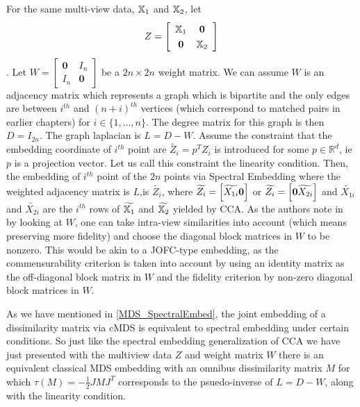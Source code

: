\documentclass[12pt,oneside,final]{thesis}\usepackage[]{graphicx}\usepackage[]{color}
\begin{document}
For the same multi-view data, $\mathbb{X}_1$ and $\mathbb{X}_2$,
let \[ Z= \left[
\begin{array}{cc}
                  \X_1 & \bm{0} \\
                \bm{0}   & \X_2 
                \end{array}
                \right]
                \].
                Let $W=\left[
                \begin{array}{cc}
                \bm{0} & I_n \\
                I_n   & \bm{0}
                \end{array}
                \right]$ be a $2n \times 2n$ weight matrix. We can assume $W$ is an adjacency matrix which represents a graph which is bipartite and the only  edges are between $i^{th}$ and $(n+i)^{th}$ vertices (which correspond to matched pairs in earlier chapters) for $i \in \{1,\ldots,n\}$. The degree matrix for this graph is then  $D=I_{2n}$. The graph laplacian is $L=D-W$. Assume the constraint that the embedding coordinate of $i^{th}$ point are $\widetilde{Z_i}=p^{T}Z_i$ is introduced for some $p \in \mathbb{R}^d$, ie $p$ is a projection vector. Let us call this constraint the linearity condition. Then, the embedding of $i^{th}$ point of the $2n$ points  via Spectral Embedding where the weighted adjacency matrix is $L$,is $\widetilde{Z_i}$, where $\widetilde{Z_i}= \left[ \widetilde{X_{1i}} \onespace \bm{0} \right]$ or  $\widetilde{Z_i}=\left[ \bm{0} \onespace \widetilde{X_{2i}} \right]$ and $\widetilde{X_{1i}}$ and $\widetilde{X_{2i}}$ are  the $i^{th}$ rows of $\widetilde{\mathbb{X}_1}$ and $\widetilde{\mathbb{X}_2}$ yielded by CCA.  As the authors note in \cite{CCAviaSpectralEmbed} by looking at $W$, one can take intra-view similarities into account (which means preserving more fidelity) and choose the diagonal block matrices in $W$ to be nonzero.
                This would be akin to a JOFC-type embedding, as the commensurability criterion is taken into account by using  an identity matrix as the  off-diagonal block matrix in $W$ and the fidelity criterion by non-zero diagonal block matrices in $W$.
                
             As we have mentioned in \ref{MDS_SpectralEmbed}, the joint embedding of a dissimilarity matrix  via cMDS  is equivalent to spectral embedding under certain conditions.
So just like the spectral embedding generalization of CCA  we have just presented with the multiview data $Z$ and weight matrix $W$ there is an equivalent classical MDS embedding with an omnibus dissimilarity matrix $M$ for which $\tau(M)=-\frac{1}{2}JMJ^T$  corresponds  to the  psuedo-inverse of  $L=D-W$, along with the linearity condition.
\end{document}
